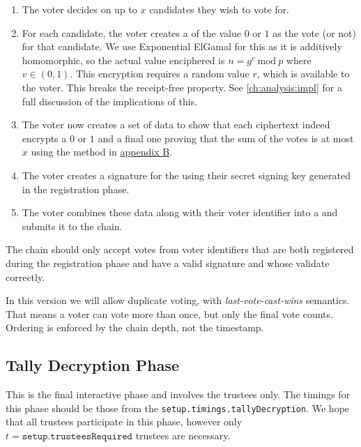 \begin{enumerate}
    \item The voter decides on up to $x$ candidates they wish to vote for.
    \item For each candidate, the voter creates a  of the value $0$ or $1$ as the vote (or not) for that candidate. We use Exponential ElGamal for this as it is additively homomorphic, so the actual value enciphered is $n = g^v\ \textrm{mod}\ p$ where $v \in (0,1)$. This encryption requires a random value $r$, which is available to the voter. This breaks the receipt-free property. See \autoref{ch:analysis:impl} for a full discussion of the implications of this.
    \item The voter now creates a set of  data to show that each ciphertext indeed encrypts a $0$ or $1$ and a final one proving that the sum of the votes is at most $x$ using the method in \hyperref[proc:zkp:enc]{appendix B}.
    \item The voter creates a signature for the  using their secret signing key generated in the registration phase.
    \item The voter combines these data along with their voter identifier into a  and submits it to the chain.
\end{enumerate}

The chain should only accept votes from voter identifiers that are both registered during the registration phase and have a valid signature and whose  validate correctly.

In this version we will allow duplicate voting, with \emph{last-vote-cast-wins} semantics. That means a voter can vote more than once, but only the final vote counts. Ordering is enforced by the chain depth, not the timestamp.

\subsection{Tally Decryption Phase}
\label{ch:astris:detail:tally}

This is the final interactive phase and involves the trustees only. The timings for this phase should be those from the \texttt{setup.timings.tallyDecryption}. We hope that all trustees participate in this phase, however only $t = \texttt{setup.trusteesRequired}$ trustees are necessary.

